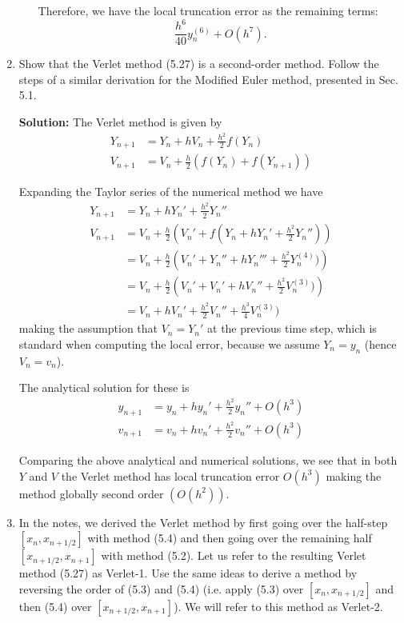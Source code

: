\documentclass[11pt]{article}
\def\f{\frac }
\newcommand{\oh}[1]{O(h^{{#1}})}
\begin{document}
\begin{enumerate}
\begin{enumerate}
Therefore, we have the local truncation error as the remaining terms:
\[ \f{h^6}{40} y_n ^{(6)} + \oh{7} .\]
\end{enumerate}

\clearpage
\pagebreak
\item Show that the Verlet method (5.27) is a second-order method.
Follow the steps of a similar derivation for the Modified Euler method, presented in Sec. 5.1.

\bigskip
\textbf{Solution:} The Verlet method is given by
\begin{align*} Y_{n+1} &=Y_{n} + h V_{n} + \f{h^2}{2} f(Y_{n} ) \\
V_{n+1} &=V_{n} + \f{h}{2} \left( f(Y_{n} ) + f(Y_{n+1} ) \right ) \end{align*}

Expanding the Taylor series of the numerical method we have
\begin{align*} Y_{n+1} &=Y_{n} + h Y_{n}' + \f{h^2}{2} Y_{n}'' \\
V_{n+1} &=V_{n} + \f{h}{2} \left( V_{n}'  + f(Y_{n} + h Y_{n}' + \f{h^2}{2} Y_{n}'') \right ) \\
&=V_{n} + \f{h}{2} \left( V_{n}'  + Y_{n}'' + h Y_{n}''' + \f{h^2}{2} Y_{n}^{(4)}) \right ) \\
&=V_{n} + \f{h}{2} \left( V_{n}'  + V_{n}' + h V_{n}'' + \f{h^2}{2} V_{n}^{(3)}) \right ) \\
&=V_{n} + h V_{n}'  +\f{ h^2 }{ 2 } V_{n}'' + \f{h^3}{4} V_{n}^{(3)}) \end{align*}
making the assumption that $V_n = Y_n'$ at the previous time step, which is standard when computing the local error, because we assume $Y_n = y_n$ (hence $V_n = v_n$).

The analytical solution for these is
\begin{align*} y_{n+1} &=y_{n} + h y_{n}' + \f{h^2}{2} y_{n}'' + \oh{3} \\
v_{n+1} &=v_{n} + h v_{n}' + \f{h^2}{2} v_{n}'' + \oh{3} \end{align*}

Comparing the above analytical and numerical solutions, we see that in both $Y$ and $V$ the Verlet method has local truncation error $\oh{3}$ making the method globally second order $(\oh{2})$.

\clearpage
\pagebreak
\item In the notes, we derived the Verlet method by first going over the half-step $[x_n, x_{n+1/2}]$ with method (5.4) and then going over the remaining half $[x_{n+1/2},x_{n+1}]$ with method (5.2).
Let us refer to the resulting Verlet method (5.27) as Verlet-1.
Use the same ideas to derive a method by reversing the order of (5.3) and (5.4) (i.e. apply (5.3) over $[x_{n},x_{n+1/2}]$ and then (5.4) over $[x_{n+1/2},x_{n+1}]$).
We will refer to this method as Verlet-2.


\end{enumerate}
\end{document}
